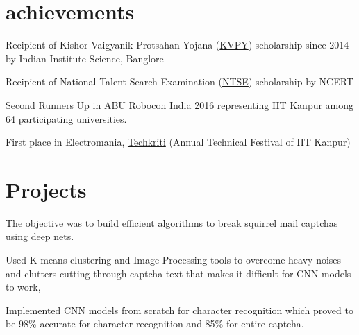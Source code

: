 \documentclass[]{deedy-resume-openfont}
\begin{document}
\begin{minipage}[t]{0.69\textwidth}
\section{achievements}
\vspace{2mm}
\begin{tightemize}
	\item Recipient of Kishor Vaigyanik Protsahan Yojana (\href{http://www.kvpy.iisc.ernet.in/main/index.htm}{KVPY}) scholarship since 2014 by Indian Institute Science, Banglore
	\item Recipient of National Talent Search Examination (\href{http://www.ncert.nic.in/programmes/talent_exam/index_talent.html}{NTSE}) scholarship by NCERT 
	\item Second Runners Up in \href{http://www.roboconindia.com/}{ABU Robocon India} 2016 representing IIT Kanpur among 64 participating universities.
	\item First place in Electromania, \href{https://techkriti.org/}{Techkriti} (Annual Technical Festival of IIT Kanpur)
\end{tightemize}

\section{Projects}

\begin{tightemize}
\item The objective was to build efficient algorithms to break squirrel mail captchas using deep nets.
\item Used K-means clustering and Image Processing tools to overcome heavy noises and clutters cutting through captcha text that makes it difficult for CNN models to work,
\item Implemented CNN models from scratch for character recognition which proved to be 98\% accurate for character recognition and 85\% for entire captcha.
\end{tightemize}

\\\hspace{0.5cm}


\end{minipage}
\end{document}
